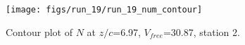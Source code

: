 \begin{figure}[H]
\centering
\texttt{[image: figs/run\_19/run\_19\_num\_contour]}
\caption{Contour plot of $N$ at $z/c$=6.97, $V_{free}$=30.87, station 2.}
\label{fig:run_19_num_contour}
\end{figure}


